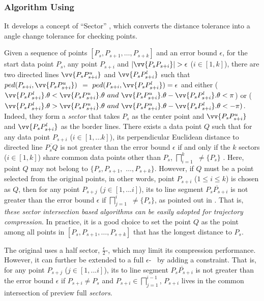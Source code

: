 \subsubsection{Algorithm \siped Using \ped \cite{Williams:Longest, Sklansky:Cone, Dunham:Cone, Zhao:Sleeve}}
It develops a concept of ``Sector'' \cite{Williams:Longest, Sklansky:Cone, Dunham:Cone, Zhao:Sleeve}, which converts the distance tolerance into a angle change tolerance for checking  points.

Given a sequence of points $[P_{s}, P_{s+1}, \ldots, P_{s+k}]$ and an error bound $\epsilon$,
for the start data point $P_s$, any point $P_{s+i}$ and $|\vv{P_sP_{s+i}}|>\epsilon$ ($i\in[1, k]$), there are two directed lines $\vv{P_sP^u_{s+i}}$ and $\vv{P_sP^l_{s+i}}$ such that $ped(P_{s+i}, \vv{P_sP^u_{s+i}})$ $=$ $ped(P_{s+i}, \vv{P_sP^l_{s+i}}) = \epsilon$ and either ($\vv{P_sP^l_{s+i}}.\theta < \vv{P_sP^u_{s+i}}.\theta ~and~\vv{P_sP^u_{s+i}}.\theta - \vv{P_sP^l_{s+i}}.\theta <\pi$) or ($\vv{P_sP^l_{s+i}}.\theta > \vv{P_sP^u_{s+i}}.\theta ~and~ \vv{P_sP^u_{s+i}}.\theta - \vv{P_sP^l_{s+i}}.\theta < -\pi)$. Indeed, they form a \emph{sector}  that takes $P_s$ as the center point and $\vv{P_sP^u_{s+i}}$ and $\vv{P_sP^l_{s+i}}$ as the border lines.
%
There exists a data point $Q$ such that for any data point $P_{s+i}$ ($i \in [1, ... k]$), its perpendicular Euclidean distance to
directed line $\overline{P_sQ}$ is not greater than the error bound $\epsilon$ if and only if the $k$ sectors  ($i\in[1,k]$) share common data points other than $P_s$, \ie $\bigsqcap_{i=1}^{k}$ $\ne \{P_s\}$ \cite{Williams:Longest, Sklansky:Cone,Zhao:Sleeve}.
%
Here, point $Q$ may not belong to $\{P_{s}, P_{s+1},$ $\ldots, P_{s+k}\}$.
However, if $Q$ must be a point selected from the original points, in other words, point $P_{s+i}$ ($1\le i\le k$) is chosen as $Q$, then
for any point $P_{s+j}$ ($j \in [1, ... i]$), its \ped to
line segment $\overline{P_sP_{s+i}}$ is not greater than the error bound $\epsilon$ if $\bigsqcap_{j=1}^{i}$ $\ne \{P_s\}$, as pointed out in \cite{Zhao:Sleeve}.
That is, {\em these sector intersection based algorithms can be easily adopted for trajectory compression}.
In practice, it is a good choice to set the point $Q$ as the point among all points in $[P_{s}, P_{s+1}, \ldots, P_{s+k}]$ that has the longest distance to $P_s$.


The original \siped uses a half sector, $\frac{\epsilon}{2}$-\sector, which may limit its compression performance. However, it can further be extended to a full ${\epsilon}$-\sector ~ by adding a constraint. That is, for any point $P_{s+j}$ ($j \in [1, ... i]$), its \ped to
line segment $\overline{P_sP_{s+i}}$ is not greater than the error bound $\epsilon$ if $ P_{s+i} \ne {P_s}$ and $P_{s+i}\in \bigsqcap_{j=1}^{i-1}$, \ie $P_{s+i}$ lives in the common intersection of preview full \emph{sectors}.



